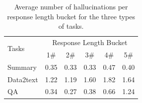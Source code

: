 \begin{table}[!t]
\scriptsize
\centering
    \begin{tabular}{l|ccccc}
    \toprule
    \multirow{2}{*}{Tasks} & \multicolumn{5}{c}{Response Length Bucket} \\
     &  1\# &  2\# &  3\# &  4\# &  5\# \\
     \midrule
     Summary  & 0.35   & 0.33  & 0.33 & 0.47 & 0.40 \\
     Data2text  & 1.22  & 1.19 & 1.60 & 1.82 & 1.64 \\
     QA & 0.34 & 0.27 & 0.38 & 0.66 & 1.24  \\
    \bottomrule
    \end{tabular}
    \caption{Average number of hallucinations per response length bucket for the three types of tasks.}
    \label{tab:rl-vs-halu}
\end{table}
